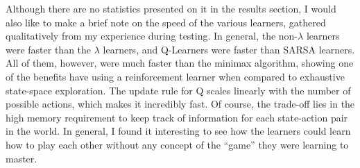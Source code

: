 \documentclass{article}
\begin{document}
Although there are no statistics presented on it in the results section, I would also like to make a brief note on the speed of the various learners, gathered qualitatively from my experience during testing. In general, the non-$\lambda$ learners were faster than the $\lambda$ learners, and Q-Learners were faster than SARSA learners. All of them, however, were much faster than the minimax algorithm, showing one of the benefits have using a reinforcement learner when compared to exhaustive state-space exploration. The update rule for Q scales linearly with the number of possible actions, which makes it incredibly fast. Of course, the trade-off lies in the high memory requirement to keep track of information for each state-action pair in the world. In general, I found it interesting to see how the learners could learn how to play each other without any concept of the ``game'' they were learning to master.
\end{document}

